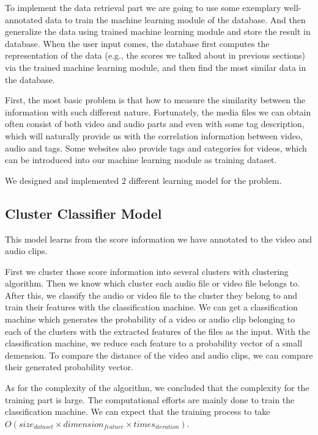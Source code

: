 \documentclass{report}
\begin{document}
To implement the data retrieval part we are going to use some exemplary well-annotated data to train the machine learning module of the database. And then generalize the data using trained machine learning module and store the result in database. When the user input comes, the database first computes the representation of the data (e.g., the scores we talked about in previous sections) via the trained machine learning module, and then find the most similar data in the database.

First, the most basic problem is that how to measure the similarity between the information with such different nature. Fortunately, the media files we can obtain often consist of both video and audio parts and even with some tag description, which will naturally provide us with the correlation information between video, audio and tags. Some websites also provide tags and categories for videos, which can be introduced into our machine learning module as training dataset.
 
We designed and implemented 2 different learning model for the problem.

\subsection{Cluster Classifier Model}

This model learns from the score information we have annotated to the video and audio clips.

First we cluster those score information into several clusters with clustering algorithm. Then we know which cluster each audio file or video file belongs to. After this, we classify the audio or video file to the cluster they belong to and train their features with the classification machine. We can get a classification machine which generates the probability of a video or audio clip belonging to each of the clusters with the extracted features of the files as the input. With the classification machine, we reduce each feature to a probability vector of a small demension. To compare the distance of the video and audio clips, we can compare their generated probability vector. 

As for the complexity of the algorithm, we concluded that the complexity for the training part is large. The computational efforts are mainly done to train the classification machine. We can expect that the training process to take $O(size_{dataset} \times dimension_{feature} \times times_{iteration})$.
\end{document}
